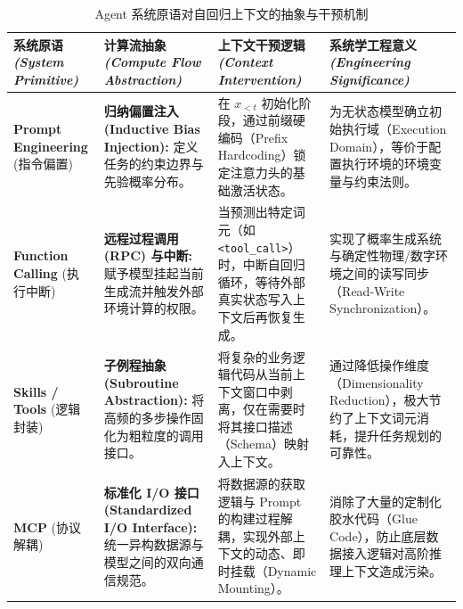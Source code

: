 \begin{table}[htbp]
    \centering
    \caption{Agent 系统原语对自回归上下文的抽象与干预机制}
    \label{tab:agent_system_primitives}
    \renewcommand{\arraystretch}{1.4}
    \begin{tabular}{@{} p{} p{} p{} p{} @{}}
        \toprule
        \textbf{系统原语} \newline \textit{(System Primitive)} & 
        \textbf{计算流抽象} \newline \textit{(Compute Flow Abstraction)} & 
        \textbf{上下文干预逻辑} \newline \textit{(Context Intervention)} & 
        \textbf{系统学工程意义} \newline \textit{(Engineering Significance)} \\
        \midrule
        
        \textbf{Prompt Engineering} \newline (指令偏置) & 
        \textbf{归纳偏置注入 (Inductive Bias Injection):} 定义任务的约束边界与先验概率分布。 & 
        在 $x_{<t}$ 初始化阶段，通过前缀硬编码（Prefix Hardcoding）锁定注意力头的基础激活状态。 & 
        为无状态模型确立初始执行域（Execution Domain），等价于配置执行环境的环境变量与约束法则。 \\
        
        \textbf{Function Calling} \newline (执行中断) & 
        \textbf{远程过程调用 (RPC) 与中断:} 赋予模型挂起当前生成流并触发外部环境计算的权限。 & 
        当预测出特定词元（如 \verb|<tool_call>|）时，中断自回归循环，等待外部真实状态写入上下文后再恢复生成。 & 
        实现了概率生成系统与确定性物理/数字环境之间的读写同步（Read-Write Synchronization）。 \\
        
        \textbf{Skills / Tools} \newline (逻辑封装) & 
        \textbf{子例程抽象 (Subroutine Abstraction):} 将高频的多步操作固化为粗粒度的调用接口。 & 
        将复杂的业务逻辑代码从当前上下文窗口中剥离，仅在需要时将其接口描述（Schema）映射入上下文。 & 
        通过降低操作维度（Dimensionality Reduction），极大节约了上下文词元消耗，提升任务规划的可靠性。 \\
        
        \textbf{MCP} \newline (协议解耦) & 
        \textbf{标准化 I/O 接口 (Standardized I/O Interface):} 统一异构数据源与模型之间的双向通信规范。 & 
        将数据源的获取逻辑与 Prompt 的构建过程解耦，实现外部上下文的动态、即时挂载（Dynamic Mounting）。 & 
        消除了大量的定制化胶水代码（Glue Code），防止底层数据接入逻辑对高阶推理上下文造成污染。 \\
        \bottomrule
    \end{tabular}
\end{table}
